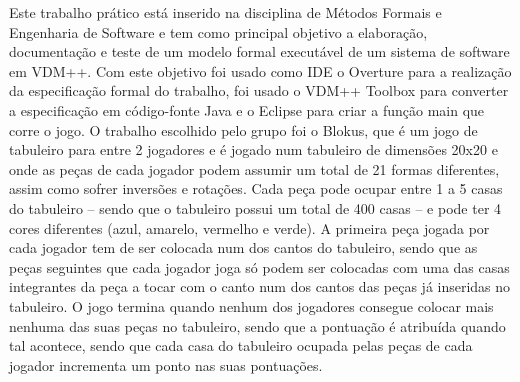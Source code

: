Este trabalho prático está inserido na disciplina de Métodos Formais e Engenharia de Software e tem como principal objetivo a elaboração, documentação e teste de um modelo formal executável de um sistema de software em VDM++. Com este objetivo foi usado como IDE o Overture para a realização da especificação formal do trabalho, foi usado o VDM++ Toolbox para converter a especificação em código-fonte Java e o Eclipse para criar a função main que corre o jogo.
O trabalho escolhido pelo grupo foi o Blokus, que é um jogo de tabuleiro para entre 2 jogadores e é jogado num tabuleiro de dimensões 20x20 e onde as peças de cada jogador podem assumir um total de 21 formas diferentes, assim como sofrer inversões e rotações.  Cada peça pode ocupar entre 1 a 5 casas do tabuleiro – sendo que o tabuleiro possui um total de 400 casas – e pode ter 4 cores diferentes (azul, amarelo, vermelho e verde).
A primeira peça jogada por cada jogador tem de ser colocada num dos cantos do tabuleiro, sendo que as peças seguintes que cada jogador joga só podem ser colocadas com uma das casas integrantes da peça a tocar com o canto num dos cantos das peças já inseridas no tabuleiro. O jogo termina quando nenhum dos jogadores consegue colocar mais nenhuma das suas peças no tabuleiro, sendo que a pontuação é atribuída quando tal acontece, sendo que cada casa do tabuleiro ocupada pelas peças de cada jogador incrementa um ponto nas suas pontuações.
